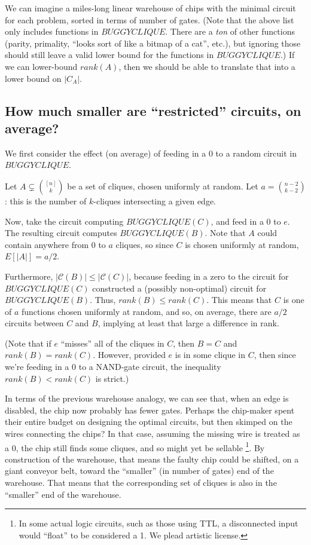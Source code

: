 \documentclass[12pt]{article}
\theoremstyle{definition}
\newcommand{\bigC}[0]{\mathcal{C}}
\begin{document}
We can imagine a miles-long linear warehouse of chips with the minimal
circuit for each problem, sorted in terms of number of gates.
(Note that the above list only includes functions in $BUGGYCLIQUE$.
There are a {\em ton} of other functions (parity, primality, ``looks
sort of like a bitmap of a cat'', etc.), but ignoring
those should still leave a valid lower bound for the functions in $BUGGYCLIQUE$.)
If we can lower-bound $rank(A)$, then we should be able to translate
that into a
lower bound on $|C_A|$.

\subsection{How much smaller are ``restricted'' circuits, on average?}

We first consider the effect (on average) of feeding in a 0
to a random circuit in $BUGGYCLIQUE$.

Let $A \subsetneq {[n] \choose k}$ be a set of cliques,
chosen uniformly at random.
Let $a = {n-2 \choose k-2}$: this is the number of $k$-cliques
intersecting a given edge.

Now, take the circuit computing $BUGGYCLIQUE(C)$, and
feed in a 0 to $e$. The resulting circuit computes
$BUGGYCLIQUE(B)$. Note that $A$ could contain anywhere
from 0 to $a$
cliques, so since $C$ is chosen uniformly at random,
$E[|A|] = a/2$.

Furthermore, $|\bigC(B)| \le |\bigC(C)|$, because feeding in
a zero to the circuit for $BUGGYCLIQUE(C)$ constructed a
(possibly non-optimal) circuit for $BUGGYCLIQUE(B)$.
Thus, $rank(B) \le rank(C)$.
This means that
$C$ is one of $a$ functions chosen uniformly at random,
and so, on average, there are $a/2$ circuits between $C$
and $B$, implying at least that large a difference in rank.

(Note that if $e$ ``misses'' all of the cliques in $C$, then $B = C$
and $rank(B) = rank(C)$. However, provided $e$ is in some clique in $C$,
then since we're feeding in a 0 to a NAND-gate circuit,
the inequality $rank(B) < rank(C)$ is strict.)

In terms of the previous warehouse analogy, we can see that,
when an edge is disabled, the chip now probably has fewer gates.
Perhaps the chip-maker spent their entire budget on designing the
optimal circuits, but then skimped on the wires connecting the chips?
In that case, assuming the missing wire is treated as a 0, the chip still
finds some cliques, and so might yet be sellable
\footnote{In some actual logic circuits, such as those
using TTL, a disconnected input
would ``float'' to be considered a 1. We plead artistic license.}.
By construction of the warehouse, that means the faulty chip could be shifted,
on a giant conveyor belt,
toward the ``smaller'' (in number of gates) end of the warehouse.
That means that the corresponding set of cliques is also
in the ``smaller'' end of the warehouse.
\end{document}
